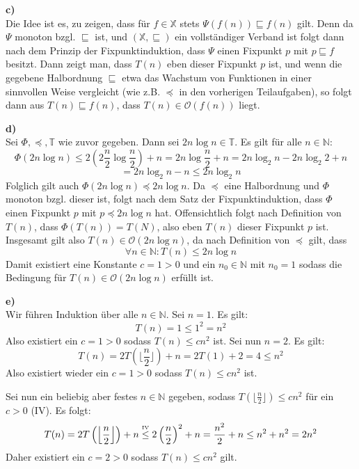 \documentclass[a4paper,graphics,11pt]{article}
\newcommand{\up}[2]{\mathrel{\overset{\makebox[0pt]{\mbox{\normalfont\tiny #2}}}{#1}}}
\begin{document}
\textbf{c)}\\
Die Idee ist es, zu zeigen, dass für $f \in \mathbb{X}$ stets $\Psi(f(n)) \sqsubseteq f(n)$ gilt.
Denn da $\Psi$ monoton bzgl. $\sqsubseteq$ ist, und $(\mathbb{X}, \sqsubseteq)$ ein vollständiger
Verband ist folgt dann nach dem Prinzip der Fixpunktinduktion, dass $\Psi$ einen Fixpunkt $p$
mit $p \sqsubseteq f$ besitzt. Dann zeigt man, dass $T(n)$ eben dieser Fixpunkt $p$ ist, und
wenn die gegebene Halbordnung $\sqsubseteq$ etwa das Wachstum von Funktionen in einer
sinnvollen Weise vergleicht (wie z.B. $\preceq$ in den vorherigen Teilaufgaben), so
folgt dann aus $T(n) \sqsubseteq f(n)$, dass $T(n) \in \mathcal{O}(f(n))$ liegt.

\textbf{d)}\\
Sei $\Phi, \preceq, \mathbb{T}$ wie zuvor gegeben. Dann sei $2n \log n \in \mathbb{T}$.
Es gilt für alle $n \in \mathbb{N}$:
$$
    \Phi(2n\log n)
    \leq 2\left(2\frac{n}{2} \log \frac{n}{2}\right) + n
    = 2n\log\frac{n}{2} + n
    = 2n\log_2 n - 2n \log_2 2 + n
$$$$
    = 2n \log_2 n - n
    \leq 2n \log_2 n
$$
Folglich gilt auch $\Phi(2n \log n)\preceq 2n \log n$. Da $\preceq$ eine Halbordnung und
$\Phi$ monoton bzgl. dieser ist, folgt nach dem Satz der Fixpunktinduktion, dass $\Phi$ einen
Fixpunkt $p$ mit $p \preceq 2n\log n$ hat. Offensichtlich folgt nach Definition von $T(n)$,
dass $\Phi(T(n)) = T(N)$, also eben $T(n)$ dieser Fixpunkt $p$ ist.
Insgesamt gilt also $T(n) \in \mathcal{O}(2n\log n)$, da nach Definition von $\preceq$ gilt,
dass
$$
\forall n \in \mathbb{N} : T(n) \leq 2n\log n
$$
Damit existiert eine Konstante $c = 1 > 0$ und ein $n_0 \in \mathbb{N}$ mit $n_0 = 1$ sodass
die Bedingung für $T(n) \in \mathcal{O}(2n\log n)$ erfüllt ist.

\textbf{e)}\\
Wir führen Induktion über alle $n \in \mathbb{N}$.
Sei $n = 1$. Es gilt:
$$
    T(n) = 1 \leq 1^2 = n^2
$$
Also existiert ein $c = 1 > 0$ sodass $T(n) \leq c n^2$ ist.
Sei nun $n = 2$. Es gilt:
$$
    T(n)
    = 2 T\left(\bigg\lfloor \frac{n}{2}\bigg\rfloor\right) + n
    = 2 T(1) + 2
    = 4
    \leq n^2
$$
Also existiert wieder ein $c = 1 > 0$ sodass $T(n) \leq c n^2$ ist.

Sei nun ein beliebig aber festes $n \in \mathbb{N}$ gegeben, sodass $T(\lfloor \frac{n}{2} \rfloor) \leq cn^2$ für ein $c > 0$ (IV).
Es folgt:
$$
    T(n) = 2 T\left(\left\lfloor \frac{n}{2} \right\rfloor\right)+n
    \up{\leq}{IV} 2 \left(\frac{n}{2}\right)^2+ n
    = \frac{n^2}{2} + n
    \leq n^2 + n^2 = 2n^2
$$
Daher existiert ein $c = 2 > 0$ sodass $T(n) \leq cn^2$ gilt.
\end{document}
